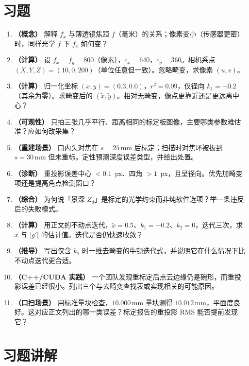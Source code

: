 \section{习题}
\label{sec:ch02-exercises}

\begin{enumerate}
  \item \textbf{（概念）} 解释 $f_x$ 与薄透镜焦距 $f$（毫米）的关系；像素变小（传感器更密）时，同样光学 $f$ 下 $f_x$ 如何变？
  \item \textbf{（计算）} 设 $f_x=f_y=800$（像素），$c_x=640$，$c_y=360$。相机系点 $(X,Y,Z)=(10,0,200)$（单位任意但一致）。忽略畸变，求像素 $(u,v)$。
  \item \textbf{（计算）} 归一化坐标 $(x,y)=(0.3,0.0)$，$r^2=0.09$，仅径向 $k_1=-0.2$（其余为零）。求畸变后的 $(\tilde{x},\tilde{y})$。相对无畸变，像点更靠近还是更远离中心？
  \item \textbf{（可观性）} 只拍三张几乎平行、距离相同的标定板图像，主要哪类参数难估准？应如何改采集？
  \item \textbf{（重建场景）} 口内头对焦在 $s=25\,\mathrm{mm}$ 后标定；扫描时对焦环被扳到 $s=30\,\mathrm{mm}$ 但未重标。定性预测深度误差类型，并给出处置。
  \item \textbf{（诊断）} 重投影误差中心 $<0.1$~px、四角 $>1$~px，且呈径向。优先加畸变项还是提高角点检测窗口？
  \item \textbf{（综合）} 为何说「景深 $Z_d$」是标定的光学约束而非纯软件选项？举一条违反后的失败模式。
  \item \textbf{（计算）} 用正文的不动点迭代，$\tilde{x}=0.5$、$k_1=-0.2$、$k_2=0$，迭代三次，求 $x$ 与 $|g'|$ 的估计值。迭代是否仍快速收敛？
  \item \textbf{（推导）} 写出仅含 $k_1$ 时一维去畸变的牛顿迭代式，并说明它在什么情况下比不动点迭代更合适。
  \item \textbf{（C++/CUDA 实践）} 一个团队发现重标定后点云边缘仍是碗形，而重投影误差已经很小。列出三个与去畸变查找表或实现相关的可能原因。
  \item \textbf{（口扫场景）} 用标准量块检查，$10.000\,\mathrm{mm}$ 量块测得 $10.012\,\mathrm{mm}$，平面度良好。这对应正文列出的哪一类误差？标定报告的重投影 RMS 能否提前发现它？
\end{enumerate}

\section{习题讲解}
\label{sec:ch02-solutions}

